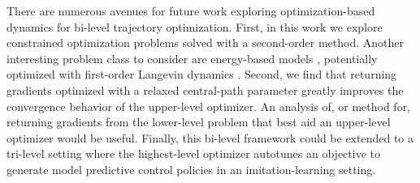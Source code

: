 There are numerous avenues for future work exploring optimization-based dynamics for bi-level trajectory optimization. First, in this work we explore constrained optimization problems solved with a second-order method. Another interesting problem class to consider are energy-based models \cite{lecun2006tutorial}, potentially optimized with first-order Langevin dynamics \cite{schlick2010molecular}. Second, we find that returning gradients optimized with a relaxed central-path parameter greatly improves the convergence behavior of the upper-level optimizer. An analysis of, or method for, returning gradients from the lower-level problem that best aid an upper-level optimizer would be useful. Finally, this bi-level framework could be extended to a tri-level setting where the highest-level optimizer autotunes an objective to generate model predictive control policies in an imitation-learning setting.

